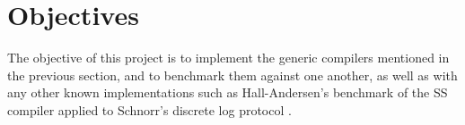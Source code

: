 \documentclass[a4paper,fleqn,12pt]{article}
\begin{document}

\section{Objectives}
The objective of this project is to implement the generic compilers mentioned in the previous section, and to benchmark them against one another, as well as with any other known implementations such as Hall-Andersen's benchmark of the SS compiler \cite{StackingSigmas} applied to Schnorr's discrete log protocol \cite{Schnorr}. 
\end{document}

